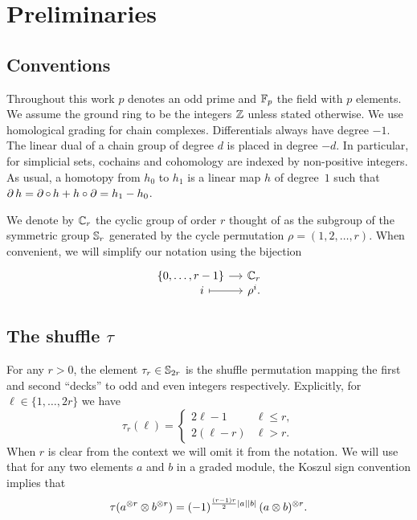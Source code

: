 
\section{Preliminaries}\label{s:preliminaries}

\subsection{Conventions}

Throughout this work $p$ denotes an odd prime and ${\mathbb{F}_p}$ the field with $p$ elements.
We assume the ground ring to be the integers $\mathbb{Z}$ unless stated otherwise.
We use homological grading for chain complexes.
Differentials always have degree $-1$.
The linear dual of a chain group of degree $d$ is placed in degree $-d$.
In particular, for simplicial sets, cochains and cohomology are	indexed by non-positive integers.
As usual, a homotopy from $h_0$ to $h_1$ is a linear map $h$ of degree~$1$ such that $\operatorname{\partial} h = \operatorname{\partial} \mathbin{\circ} \,h + h \mathbin{\circ} \operatorname{\partial} = h_1 - h_0$.

We denote by $\mathbb{C}_r$ the cyclic group of order $r$ thought of as the subgroup of the symmetric group $\mathbb{S}_r$ generated by the cycle permutation $\rho = (1,2,\dots,r)$.
When convenient, we will simplify our notation using the bijection
\[
\begin{tikzcd}[column sep=small,row sep=-5]
	\{0,\dots,r-1\} \rar & \cyc_r \\
	\qquad i \rar[maps to] & \rho^i.
\end{tikzcd}
\]

\subsection{The shuffle $\tau$}\label{ss:shuffle}

For any $r > 0$, the element $\tau_r \in \mathbb{S}_{2r}$ is the shuffle permutation mapping the first and second ``decks'' to odd and even integers respectively.
Explicitly, for $\ell \in \{1,\dots,2r\}$ we have
\begin{equation*}
	\tau_r(\ell) =
	\begin{cases}
		2\ell-1 & \ell \leq r, \\
		2(\ell-r) & \ell > r.
	\end{cases}
\end{equation*}
When $r$ is clear from the context we will omit it from the notation.
We will use that for any two elements $a$ and $b$ in a graded module, the Koszul sign convention implies that
\[
\tau(a^{\otimes r} \otimes b^{\otimes r}) =
(-1)^{\frac{(r-1)r}{2}\lvert a\rvert\lvert b\rvert} \, (a \otimes b)^{\otimes r}.
\]

